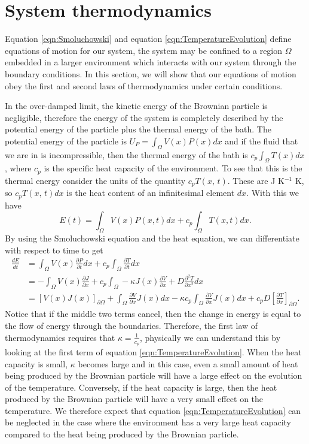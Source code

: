 \section{System thermodynamics} \label{thermodynamics}
Equation \ref{eqn:Smoluchowski} and equation \ref{eqn:TemperatureEvolution} define equations of motion for our system, the system may be confined to a region $\Omega$ embedded in a larger environment which interacts with our system through the boundary conditions. In this section, we will show that our equations of motion obey the first and second laws of thermodynamics under certain conditions.

In the over-damped limit, the kinetic energy of the Brownian particle is negligible, therefore the energy of the system is completely described by the potential energy of the particle plus the thermal energy of the bath. The potential energy of the particle is $U_P = \int_{\Omega} V(x) P(x) dx$ and if the fluid that we are in is incompressible, then the thermal energy of the bath is $c_p \int_{\Omega} T(x) dx$, where $c_p$ is the specific heat capacity of the environment. To see that this is the thermal energy consider the units of the quantity $c_p T(x, \, t)$. These are J K$^{-1}$ K, so $c_p T(x, \, t) dx$ is the heat content of an infinitesimal element $dx$. With this we have
\begin{equation}
E(t) = \int_{\Omega} V(x)P(x, t) dx + c_p \int_{\Omega} T(x, t) dx. \label{eqn:energy}
\end{equation}
By using the Smoluchowski equation and the heat equation, we can differentiate with respect to time to get
\begin{align}
\frac{d E}{d t} & = \int_{\Omega} V(x) \frac{\partial P}{\partial t} dx + c_p \int_{\Omega} \frac{\partial T}{\partial t} dx \\
 & = -\int_{\Omega} V(x) \frac{\partial J}{\partial x} + c_p \int_{\Omega} -\kappa J(x) \frac{\partial V}{\partial x} + D \frac{\partial^2 T}{\partial x^2} dx \\
 & = [V(x)J(x)]_{\partial \Omega}+ \int_{\Omega} \frac{\partial V}{\partial x} J(x) dx - \kappa c_p \int_{\Omega} \frac{\partial V}{\partial x} J(x) dx + c_p D \left [\frac{\partial T}{\partial x} \right]_{\partial \Omega}.
\end{align}
Notice that if the middle two terms cancel, then the change in energy is equal to the flow of energy through the boundaries. Therefore, the first law of thermodynamics requires that $\kappa = \frac{1}{c_p}$, physically we can understand this by looking at the first term of equation \ref{eqn:TemperatureEvolution}. When the heat capacity is small, $\kappa$ becomes large and in this case, even a small amount of heat being produced by the Brownian particle will have a large effect on the evolution of the temperature. Conversely, if the heat capacity is large, then the heat produced by the Brownian particle will have a very small effect on the temperature. We therefore expect that equation \ref{eqn:TemperatureEvolution} can be neglected in the case where the environment has a very large heat capacity compared to the heat being produced by the Brownian particle.

